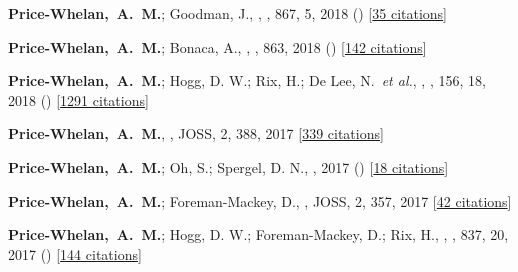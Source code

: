 \item[{\color{deemph}\scriptsize14}]\textbf{Price-Whelan,~A.~M.}; Goodman, J., , \apj, 867, 5, 2018 () [\href{http://adsabs.harvard.edu/abs/2018ApJ...867....5P}{35 citations}]

\item[{\color{deemph}\scriptsize13}]\textbf{Price-Whelan,~A.~M.}; Bonaca, A., , \apj, 863, 2018 () [\href{http://adsabs.harvard.edu/abs/2018ApJ...863L..20P}{142 citations}]

\item[{\color{deemph}\scriptsize12}]\textbf{Price-Whelan,~A.~M.}; Hogg, D. W.; Rix, H.; De Lee, N.~\textit{et al.}, , \aj, 156, 18, 2018 () [\href{http://adsabs.harvard.edu/abs/2018AJ....156...18P}{1291 citations}]

\item[{\color{deemph}\scriptsize11}]\textbf{Price-Whelan,~A.~M.}, , JOSS, 2, 388, 2017 [\href{http://adsabs.harvard.edu/abs/2017JOSS....2..388P}{339 citations}]

\item[{\color{deemph}\scriptsize10}]\textbf{Price-Whelan,~A.~M.}; Oh, S.; Spergel, D. N., , 2017 () [\href{http://adsabs.harvard.edu/abs/2017arXiv170903532P}{18 citations}]

\item[{\color{deemph}\scriptsize9}]\textbf{Price-Whelan,~A.~M.}; Foreman-Mackey, D., , JOSS, 2, 357, 2017 [\href{http://adsabs.harvard.edu/abs/2017JOSS....2..357P}{42 citations}]

\item[{\color{deemph}\scriptsize8}]\textbf{Price-Whelan,~A.~M.}; Hogg, D. W.; Foreman-Mackey, D.; Rix, H., , \apj, 837, 20, 2017 () [\href{http://adsabs.harvard.edu/abs/2017ApJ...837...20P}{144 citations}]

